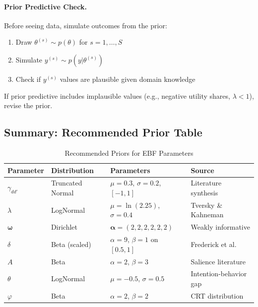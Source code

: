 \paragraph{Prior Predictive Check.}
Before seeing data, simulate outcomes from the prior:
\begin{enumerate}
\item Draw $\theta^{(s)} \sim p(\theta)$ for $s = 1, \ldots, S$
\item Simulate $y^{(s)} \sim p(y | \theta^{(s)})$
\item Check if $y^{(s)}$ values are plausible given domain knowledge
\end{enumerate}

If prior predictive includes implausible values (e.g., negative utility shares,
$\lambda < 1$), revise the prior.

\subsection{Summary: Recommended Prior Table}

\begin{table}[htbp]
\centering
\caption{Recommended Priors for EBF Parameters}
\label{tab:az-recommended-priors}
\renewcommand{\arraystretch}{1.3}
\small
\begin{tabular}{@{}llll@{}}
\toprule
\textbf{Parameter} & \textbf{Distribution} & \textbf{Parameters} & \textbf{Source} \\
\midrule
$\gamma_{dd'}$ & Truncated Normal & $\mu=0.3$, $\sigma=0.2$, $[-1,1]$ & Literature synthesis \\
$\lambda$ & LogNormal & $\mu=\ln(2.25)$, $\sigma=0.4$ & Tversky \& Kahneman \\
$\boldsymbol{\omega}$ & Dirichlet & $\boldsymbol{\alpha} = (2,2,2,2,2,2)$ & Weakly informative \\
$\delta$ & Beta (scaled) & $\alpha=9$, $\beta=1$ on $[0.5,1]$ & Frederick et al. \\
$A$ & Beta & $\alpha=2$, $\beta=3$ & Salience literature \\
$\theta$ & LogNormal & $\mu=-0.5$, $\sigma=0.5$ & Intention-behavior gap \\
$\varphi$ & Beta & $\alpha=2$, $\beta=2$ & CRT distribution \\
\bottomrule
\end{tabular}
\end{table}

